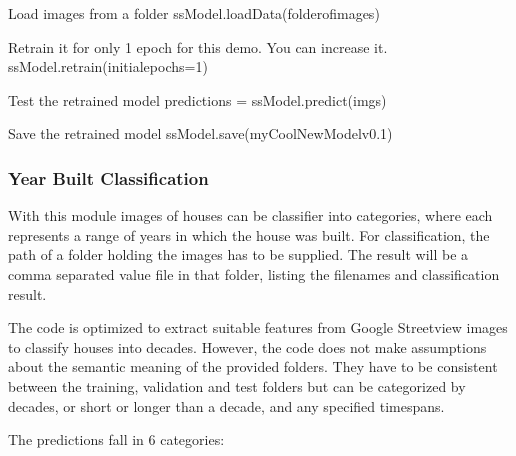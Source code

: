 \documentclass[letterpaper,10pt,english]{sphinxmanual}
\begin{document}
\begin{sphinxVerbatim}[commandchars=\\\{\}]
\PYGZsh{} Load images from a folder
ssModel.loadData(\PYGZsq{}folder\PYGZhy{}of\PYGZhy{}images\PYGZsq{})

\PYGZsh{} Re\PYGZhy{}train it for only 1 epoch for this demo. You can increase it.
ssModel.retrain(initial\PYGZus{}epochs=1)

\PYGZsh{} Test the re\PYGZhy{}trained model
predictions = ssModel.predict(imgs)

\PYGZsh{} Save the re\PYGZhy{}trained model
ssModel.save(\PYGZsq{}myCoolNewModelv0.1\PYGZsq{})
\end{sphinxVerbatim}


\subsubsection{Year Built Classification}
\label{\detokenize{common/user_manual/modules/yearClassifier:year-built-classification}}\label{\detokenize{common/user_manual/modules/yearClassifier:lbl-yearclassifier}}\label{\detokenize{common/user_manual/modules/yearClassifier::doc}}
\sphinxAtStartPar
With this module images of houses can be classifier into categories,
where each represents a range of years in which the house was built.
For classification, the path of a folder holding the images has to be supplied.
The result will be a comma separated value file in that folder,
listing the filenames and classification result.

\sphinxAtStartPar
The code is optimized to extract suitable features from Google Streetview
images to classify houses into decades. However, the code does not make
assumptions about the semantic meaning of the provided folders. They
have to be consistent between the training, validation and test folders but
can be categorized by decades, or short or longer than a decade, and any specified timespans.

\sphinxAtStartPar
The predictions fall in 6 categories:

\begin{sphinxVerbatim}[commandchars=\\\{\}]
   
  
  
  
  
   
\end{sphinxVerbatim}
\end{document}
